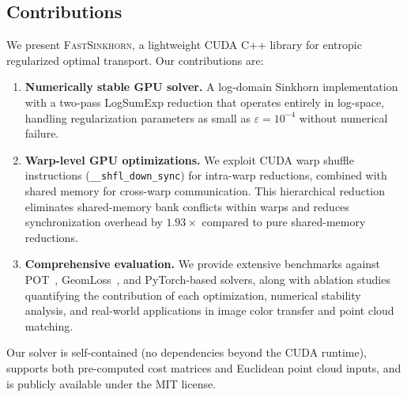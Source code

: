 \subsection{Contributions}

We present \textsc{FastSinkhorn}, a lightweight CUDA C++ library for entropic regularized optimal transport. Our contributions are:

\begin{enumerate}
    \item \textbf{Numerically stable GPU solver.} A log-domain Sinkhorn implementation with a two-pass LogSumExp reduction that operates entirely in log-space, handling regularization parameters as small as $\varepsilon = 10^{-4}$ without numerical failure.

    \item \textbf{Warp-level GPU optimizations.} We exploit CUDA warp shuffle instructions (\texttt{\_\_shfl\_down\_sync}) for intra-warp reductions, combined with shared memory for cross-warp communication. This hierarchical reduction eliminates shared-memory bank conflicts within warps and reduces synchronization overhead by $1.93\times$ compared to pure shared-memory reductions.

    \item \textbf{Comprehensive evaluation.} We provide extensive benchmarks against POT~\citep{flamary2021pot}, GeomLoss~\citep{feydy2019interpolating}, and PyTorch-based solvers, along with ablation studies quantifying the contribution of each optimization, numerical stability analysis, and real-world applications in image color transfer and point cloud matching.
\end{enumerate}

Our solver is self-contained (no dependencies beyond the CUDA runtime), supports both pre-computed cost matrices and Euclidean point cloud inputs, and is publicly available under the MIT license.
